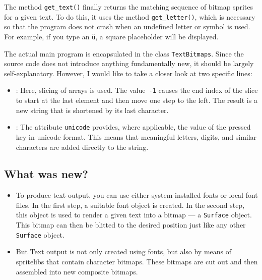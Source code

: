 The method \texttt{get\_text()} finally returns the matching sequence of bitmap sprites for a given text. To do this, it uses the method \texttt{get\_letter()}, which is necessary so that the program does not crash when an undefined letter or symbol is used. For example, if you type an \texttt{ü}, a square placeholder will be displayed.




The actual main program is encapsulated in the class \texttt{TextBitmaps}. Since the source code does not introduce anything fundamentally new, it should be largely self-explanatory. However, I would like to take a closer look at two specific lines:

\begin{itemize}
	\item {}: Here, \gls{slicing} of \glspl{array} is used. The value~\texttt{-1} causes the end index of the slice to start at the last element and then move one step to the left. The result is a new string that is shortened by its last character.
	
	\item {}: The attribute \texttt{unicode} provides, where applicable, the value of the pressed key in \gls{unicode} format. This means that meaningful letters, digits, and similar characters are added
	directly to the string.
\end{itemize}



\subsection{What was new?}
\begin{hintbox}
	\begin{itemize}
		\item To produce text output, you can use either system-installed fonts or local font files. In the first step, a suitable font object is created. In the second step, this object is used to render a given text into a bitmap --- a \texttt{Surface} object. This bitmap can then be blitted to the desired position just like any other \texttt{Surface} object.
		
		\item But Text output is not only created using fonts, but also by means of spritelibs that contain character bitmaps. These bitmaps are cut out and then assembled into new composite bitmaps.
	\end{itemize}
\end{hintbox}

